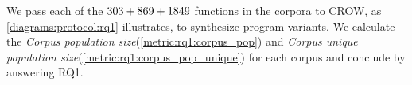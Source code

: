 We pass each of the $303 + 869 + 1849$ functions in the corpora to CROW, as \autoref{diagrams:protocol:rq1} illustrates, to synthesize program variants. We calculate the \emph{Corpus population size}(\autoref{metric:rq1:corpus_pop}) and \emph{Corpus unique population size}(\autoref{metric:rq1:corpus_pop_unique}) for each corpus and conclude by answering RQ1.
